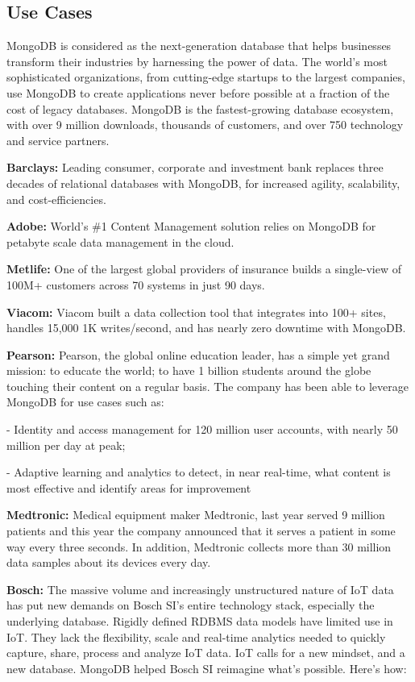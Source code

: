 \documentclass[9pt,twocolumn,twoside]{../../styles/osajnl}
\begin{document}
\subsection{Use Cases}
MongoDB is considered as the next-generation database that helps businesses transform their industries by harnessing the power of data. The world’s most sophisticated organizations, from cutting-edge startups to the largest companies, use MongoDB to create applications never before possible at a fraction of the cost of legacy databases. MongoDB is the fastest-growing database ecosystem, with over 9 million downloads, thousands of customers, and over 750 technology and service partners. \cite{www-mongo13}

\cite{www-mongo6} {\bfseries Barclays:} Leading consumer, corporate and investment bank replaces three decades of relational databases with MongoDB, for increased agility, scalability, and cost-efficiencies.

{\bfseries Adobe:} World's \#1 Content Management solution relies on MongoDB for petabyte scale data management in the cloud.

{\bfseries Metlife:} One of the largest global providers of insurance builds a single-view of 100M+ customers across 70 systems in just 90 days.

{\bfseries Viacom:} Viacom built a data collection tool that integrates into 100+ sites, handles 15,000 1K writes/second, and has nearly zero downtime with MongoDB.

{\bfseries Pearson:} Pearson, the global online education leader, has a simple yet grand mission: to educate the world; to have 1 billion students around the globe touching their content on a regular basis. The company has been able to leverage MongoDB for use cases such as:

- Identity and access management for 120 million user accounts, with nearly 50 million per day at peak;

- Adaptive learning and analytics to detect, in near real-time, what content is most effective and identify areas for improvement

{\bfseries Medtronic:} Medical equipment maker Medtronic, last year served 9 million patients and this year the company announced that it serves a patient in some way every three seconds. In addition, Medtronic collects more than 30 million data samples about its devices every day.

{\bfseries Bosch:} The massive volume and increasingly unstructured nature of IoT data has put new demands on Bosch SI's entire technology stack, especially the underlying database. Rigidly defined RDBMS data models have limited use in IoT. They lack the flexibility, scale and real-time analytics needed to quickly capture, share, process and analyze IoT data.
IoT calls for a new mindset, and a new database. MongoDB helped Bosch SI reimagine what’s possible. Here’s how:
\end{document}

